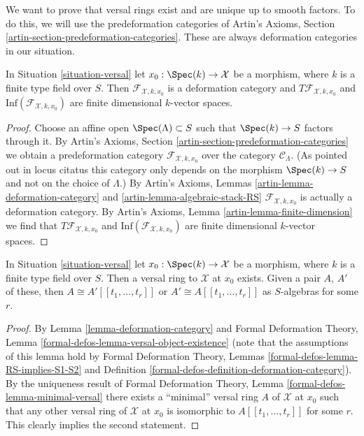 \noindent
We want to prove that versal rings exist and are unique up to
smooth factors. To do this, we will use the predeformation categories of
Artin's Axioms, Section \ref{artin-section-predeformation-categories}.
These are always deformation categories in our situation.

\begin{lemma}
\label{lemma-deformation-category}
In Situation \ref{situation-versal} let $x_0 : \Spec(k) \to \mathcal{X}$
be a morphism, where $k$ is a finite type field over $S$.
Then $\mathcal{F}_{\mathcal{X}, k, x_0}$
is a deformation category and $T\mathcal{F}_{\mathcal{X}, k, x_0}$
and $\text{Inf}(\mathcal{F}_{\mathcal{X}, k, x_0})$
are finite dimensional $k$-vector spaces.
\end{lemma}

\begin{proof}
Choose an affine open $\Spec(\Lambda) \subset S$ such that
$\Spec(k) \to S$ factors through it.
By Artin's Axioms, Section \ref{artin-section-predeformation-categories}
we obtain a predeformation category
$\mathcal{F}_{\mathcal{X}, k, x_0}$
over the category $\mathcal{C}_\Lambda$.
(As pointed out in locus citatus this category only depends
on the morphism $\Spec(k) \to S$ and not on the choice of
$\Lambda$.) By Artin's Axioms, Lemmas
\ref{artin-lemma-deformation-category} and
\ref{artin-lemma-algebraic-stack-RS}
$\mathcal{F}_{\mathcal{X}, k, x_0}$ is actually a deformation category.
By Artin's Axioms, Lemma \ref{artin-lemma-finite-dimension}
we find that $T\mathcal{F}_{\mathcal{X}, k, x_0}$
and $\text{Inf}(\mathcal{F}_{\mathcal{X}, k, x_0})$
are finite dimensional $k$-vector spaces.
\end{proof}

\begin{lemma}
\label{lemma-versal-ring}
In Situation \ref{situation-versal} let $x_0 : \Spec(k) \to \mathcal{X}$
be a morphism, where $k$ is a finite type field over $S$.
Then a versal ring to $\mathcal{X}$ at $x_0$ exists. Given a pair
$A$, $A'$ of these, then $A \cong A'[[t_1, \ldots, t_r]]$
or $A' \cong A[[t_1, \ldots, t_r]]$ as $S$-algebras
for some $r$.
\end{lemma}

\begin{proof}
By Lemma \ref{lemma-deformation-category} and
Formal Deformation Theory, Lemma
\ref{formal-defos-lemma-versal-object-existence}
(note that the assumptions of this lemma hold by
Formal Deformation Theory, Lemmas
\ref{formal-defos-lemma-RS-implies-S1-S2} and
Definition \ref{formal-defos-definition-deformation-category}).
By the uniqueness result of
Formal Deformation Theory, Lemma \ref{formal-defos-lemma-minimal-versal}
there exists a ``minimal'' versal ring $A$ of $\mathcal{X}$ at $x_0$
such that any other versal ring of $\mathcal{X}$ at $x_0$ is
isomorphic to $A[[t_1, \ldots, t_r]]$ for some $r$.
This clearly implies the second statement.
\end{proof}

